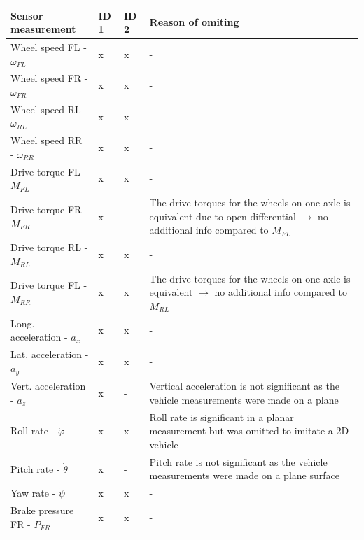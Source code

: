 \FloatBarrier
\begin{table}[h]
    \centering
    \begin{tabular}{|
            >{\raggedright\arraybackslash}m{5cm}|
            >{\centering\arraybackslash}m{0.92cm}|
            >{\centering\arraybackslash}m{0.92cm}|
            >{\raggedright\arraybackslash}m{7.5cm}|}
        \hline
        \textbf{Sensor measurement} & \textbf{ID 1} & \textbf{ID 2} & \textbf{Reason of omiting}\\
        \hline \hline
        Wheel speed FL - $\omega_{FL}$ & x & x & - \\
        \hline
        Wheel speed FR - $\omega_{FR}$ & x & x & - \\
        \hline
        Wheel speed RL - $\omega_{RL}$ & x & x & - \\
        \hline
        Wheel speed RR - $\omega_{RR}$ & x & x & - \\
        \hline
        Drive torque FL - $M_{FL}$ & x & x & - \\
        \hline
        Drive torque FR - $M_{FR}$ & x & - & The drive torques for the wheels on one axle is equivalent due to open differential $\rightarrow$ no additional info compared to $M_{FL}$ \\
        \hline
        Drive torque RL - $M_{RL}$ & x & x & - \\
        \hline
        Drive torque FL - $M_{RR}$ & x & x & The drive torques for the wheels on one axle is equivalent $\rightarrow$ no additional info compared to $M_{RL}$ \\
        \hline
        Long. acceleration - $a_x$ & x & x & - \\
        \hline
        Lat. acceleration - $a_y$ & x & x & - \\
        \hline
        Vert. acceleration - $a_z$ & x & - & Vertical acceleration is not significant as the vehicle measurements were made on a plane \\
        \hline
        Roll rate - $\dot\varphi$ & x & x & Roll rate is significant in a planar measurement but was omitted to imitate a 2D vehicle \\
        \hline
        Pitch rate - $\dot\theta$ & x & - & Pitch rate is not significant as the vehicle measurements were made on a plane surface \\
        \hline
        Yaw rate - $\dot\psi$ & x & x & - \\
        \hline
        Brake pressure FR - $P_{FR}$ & x & x & - \\

\end{tabular}
\end{table}
